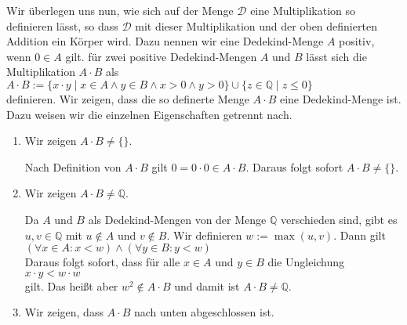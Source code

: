 Wir \"uberlegen uns nun, wie sich auf der Menge $\mathcal{D}$ eine Multiplikation so definieren l\"asst,
so dass $\mathcal{D}$ mit dieser Multiplikation und der oben definierten Addition ein K\"orper wird.
Dazu nennen wir eine Dedekind-Menge $A$ positiv, wenn $0 \in A$ gilt.  f\"ur zwei positive Dedekind-Mengen $A$
und $B$ l\"asst sich die Multiplikation $A \cdot B$ als
\\[0.2cm]
\hspace*{1.3cm}
$A \cdot B := \{ x \cdot y \mid x \in A \wedge y \in B \wedge x > 0 \wedge y > 0 \} \cup 
              \{ z \in \mathbb{Q} \mid z \leq 0 \}$
\\[0.2cm]
definieren.  Wir zeigen, dass die so definerte Menge $A \cdot B$ eine Dedekind-Menge ist.
Dazu weisen wir die einzelnen Eigenschaften getrennt nach.
\begin{enumerate}
\item Wir zeigen $A \cdot B \not= \{\}$.

      Nach Definition von $A \cdot B$ gilt $0 = 0 \cdot 0 \in A \cdot B$.   Daraus folgt sofort $A \cdot B \not= \{\}$.
\item Wir zeigen $A \cdot B \not= \mathbb{Q}$.

      Da $A$ und $B$ als Dedekind-Mengen von der Menge $\mathbb{Q}$ verschieden sind, gibt es 
      $u,v \in \mathbb{Q}$ mit $u \not\in A$ und $v \not\in B$. Wir definieren $w := \max(u, v)$.  Dann gilt 
      \\[0.2cm]
      \hspace*{1.3cm}
      $(\forall x \in A: x < w) \wedge (\forall y \in B: y < w)$
      \\[0.2cm]
      Daraus folgt sofort, dass f\"ur alle $x \in A$ und $y \in B$ die Ungleichung
      \\[0.2cm]
      \hspace*{1.3cm}
      $x \cdot y < w \cdot w$
      \\[0.2cm]
      gilt.  Das hei\ss{}t aber $w^2 \not\in A \cdot B$ und damit ist $A \cdot B \not= \mathbb{Q}$.
\item Wir zeigen, dass $A \cdot B$ nach unten abgeschlossen ist.


\end{enumerate}
